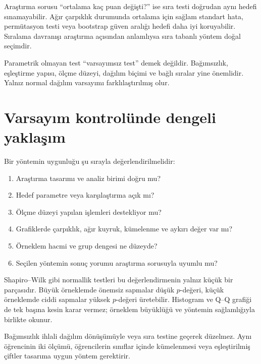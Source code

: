 Araştırma sorusu ``ortalama kaç puan değişti?'' ise sıra testi doğrudan aynı
hedefi sınamayabilir. Ağır çarpıklık durumunda ortalama için sağlam standart
hata, permütasyon testi veya bootstrap güven aralığı hedefi daha iyi
koruyabilir. Sıralama davranışı araştırma açısından anlamlıysa sıra tabanlı
yöntem doğal seçimdir.

\begin{mistakebox}
Parametrik olmayan test ``varsayımsız test'' demek değildir. Bağımsızlık,
eşleştirme yapısı, ölçme düzeyi, dağılım biçimi ve bağlı sıralar yine önemlidir.
Yalnız normal dağılım varsayımı farklılaştırılmış olur.
\end{mistakebox}

\section{Varsayım kontrolünde dengeli yaklaşım}

Bir yöntemin uygunluğu şu sırayla değerlendirilmelidir:

\begin{enumerate}
  \item Araştırma tasarımı ve analiz birimi doğru mu?
  \item Hedef parametre veya karşılaştırma açık mı?
  \item Ölçme düzeyi yapılan işlemleri destekliyor mu?
  \item Grafiklerde çarpıklık, ağır kuyruk, kümelenme ve aykırı değer var mı?
  \item Örneklem hacmi ve grup dengesi ne düzeyde?
  \item Seçilen yöntemin sonuç yorumu araştırma sorusuyla uyumlu mu?
\end{enumerate}

Shapiro--Wilk gibi normallik testleri bu değerlendirmenin yalnız küçük bir
parçasıdır. Büyük örneklemde önemsiz sapmalar düşük $p$-değeri, küçük örneklemde
ciddi sapmalar yüksek $p$-değeri üretebilir. Histogram ve Q--Q grafiği de tek
başına kesin karar vermez; örneklem büyüklüğü ve yöntemin sağlamlığıyla birlikte
okunur.

\begin{assumptionbox}
Bağımsızlık ihlali dağılım dönüşümüyle veya sıra testine geçerek düzelmez.
Aynı öğrencinin iki ölçümü, öğrencilerin sınıflar içinde kümelenmesi veya
eşleştirilmiş çiftler tasarıma uygun yöntem gerektirir.
\end{assumptionbox}

